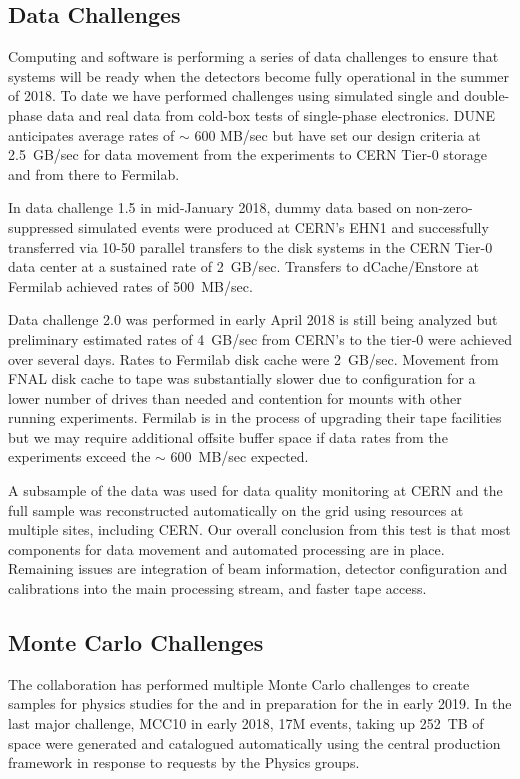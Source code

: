 \subsection{Data Challenges}

Computing and software is performing a series of data challenges to ensure that systems will be ready when the detectors become fully operational in the summer of 2018.  To date we have performed challenges using simulated single and double-phase data and real data from cold-box tests of single-phase electronics.   DUNE anticipates average rates of $\sim$ 600 MB/sec but have set our design criteria at 2.5~GB/sec for data movement from the experiments to CERN Tier-0 storage and from there to Fermilab. 

In data challenge 1.5 in mid-January 2018, dummy data based on non-zero-suppressed simulated events were produced at CERN's EHN1 and successfully transferred via 10-50 parallel transfers to the  disk systems in the CERN Tier-0 data center at a sustained rate of 2~GB/sec.    Transfers to dCache/Enstore at Fermilab achieved rates of 500~MB/sec.  

Data challenge 2.0 was performed in early April 2018 is still being analyzed but preliminary estimated  rates of 4~GB/sec from CERN's   to the tier-0 were achieved over several days. Rates to Fermilab disk cache were 2~GB/sec.  Movement from FNAL disk cache to tape was substantially slower due to configuration for a lower number of drives than needed and contention for mounts with other running experiments.   Fermilab is in the process of upgrading their tape facilities but we may require additional offsite buffer space if data rates from the experiments exceed the $\sim$ 600~MB/sec expected. 

A subsample of the data was used for data quality monitoring at CERN and the full sample was reconstructed automatically on the grid using resources at multiple sites, including CERN. 
Our overall conclusion from this test is that most components for data movement and automated processing are in place.  Remaining issues are integration of beam information, detector configuration and calibrations into the main processing stream, and faster tape access. 

\subsection{Monte Carlo Challenges}
The collaboration has performed multiple Monte Carlo challenges to create samples for physics studies for the  and in preparation for the  in early 2019.  In the last major challenge,  MCC10 in early 2018, 17M events, taking up 252~TB of space were generated and catalogued automatically using the central  production framework in response to requests by the Physics groups. 

